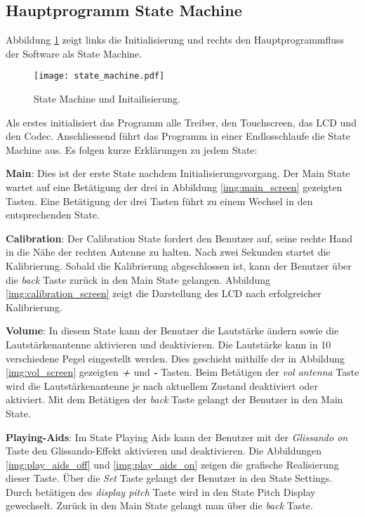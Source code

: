 \subsection{Hauptprogramm State Machine}\label{subsec:State_Machine}
Abbildung \ref{img:state_machine} zeigt links die Initialisierung und rechts den Hauptprogrammfluss der Software als State Machine.
\begin{figure}[h]
	\centering
	\texttt{[image: state\_machine.pdf]}
	\caption{State Machine und Initailisierung.}
	\label{img:state_machine}
\end{figure}

Als erstes initialisiert das Programm alle Treiber, den Touchscreen, das LCD und den Codec. Anschliessend führt das Programm in einer Endlosschlaufe die State Machine aus. Es folgen kurze Erklärungen zu jedem State:

\textbf{Main}:
Dies ist der erste State nachdem Initialisierungsvorgang. Der Main State wartet auf eine Betätigung der drei in Abbildung \ref{img:main_screen} gezeigten Tasten. Eine Betätigung der drei Tasten führt zu einem Wechsel in den entsprechenden State. 
 
\textbf{Calibration}:
Der Calibration State fordert den Benutzer auf, seine rechte Hand in die Nähe der rechten Antenne zu halten.
Nach zwei Sekunden startet die Kalibrierung. Sobald die Kalibrierung abgeschlossen ist, kann der Benutzer über die \textit{back} Taste zurück in den Main State gelangen. Abbildung \ref{img:calibration_screen} zeigt die Darstellung des LCD nach erfolgreicher Kalibrierung.

\textbf{Volume}:
In diesem State kann der Benutzer die Lautstärke ändern sowie die Lautstärkenantenne aktivieren und deaktivieren. Die Lautstärke kann in 10 verschiedene Pegel eingestellt werden. Dies geschieht mithilfe der in Abbildung \ref{img:vol_screen} gezeigten \textbf{\textit{+}} und \textbf{\textit{-}} Tasten. Beim Betätigen der \textit{vol antenna} Taste wird die Lautstärkenantenne je nach aktuellem Zustand deaktiviert oder aktiviert. Mit dem Betätigen der \textit{back} Taste gelangt der Benutzer in den Main State.
 
\textbf{Playing-Aids}:
Im State Playing Aids kann der Benutzer mit der \textit{Glissando on} Taste den Glissando-Effekt aktivieren und deaktivieren. Die Abbildungen \ref{img:play_aids_off} und \ref{img:play_aids_on} zeigen die grafische Realisierung dieser Taste. Über die \textit{Set} Taste gelangt der Benutzer in den State Settings. Durch betätigen des \textit{display pitch} Taste wird in den State Pitch Display gewechselt. Zurück in den Main State gelangt man über die \textit{back} Taste.

